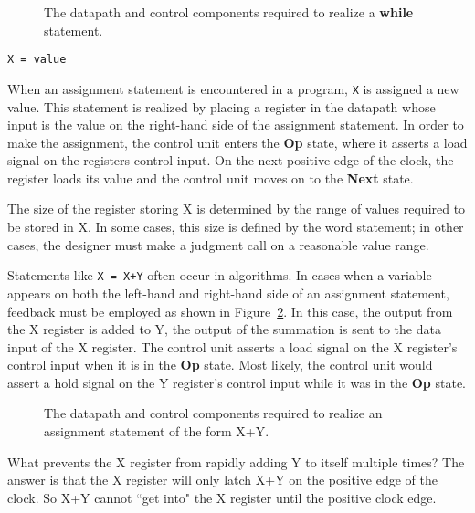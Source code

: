 \begin{description}
\begin{figure}[ht]
\caption{The datapath and control components required to realize
a \textbf{ while} statement.}
\label{fig:datapathControlWhile}
\end{figure}

\item[]\verb^X = value^

When an assignment statement is encountered in a program, 
\verb^X^ is assigned a new value.  This statement is realized by 
placing a register in the datapath whose input is the 
value on the right-hand side of the assignment statement.  
In order to make the assignment, the control unit
enters the \textbf{ Op} state, where it asserts a load signal on the
registers control input.  On the next positive edge of the 
clock, the register loads its value and the control unit
moves on to the \textbf{ Next} state.

The size of the register storing X is determined by the range
of values  required to be stored in X.  In some
cases, this size is defined by the word statement; in 
other cases, the designer must make a judgment call on a reasonable
value range.

Statements like \verb^X = X+Y^ often occur in 
algorithms.  In cases when a variable appears on both the left-hand
and right-hand side of an assignment statement, feedback must
be employed as shown in Figure~\ref{fig:datapathControlOp}.  In this case, the 
output from the X register is added to Y, the output of the summation
is sent to the data input of the X register.  The control unit
asserts a load signal on the X register's control input when
it is in the \textbf{ Op} state.  Most likely, the control unit would assert
a hold signal on the Y register's control input while it
was in the \textbf{ Op} state.

\begin{figure}[ht]
\center{\texttt{[image: Op]}}
\caption{The datapath and control components required to realize
an assignment statement of the form X+Y.}
\label{fig:datapathControlOp}
\end{figure}

What prevents the X register from rapidly adding Y to itself 
multiple times?  The answer is that the X register will 
only latch X+Y on the positive edge of the clock.  So 
X+Y cannot ``get into" the X register until the positive 
clock edge.


\end{description}
